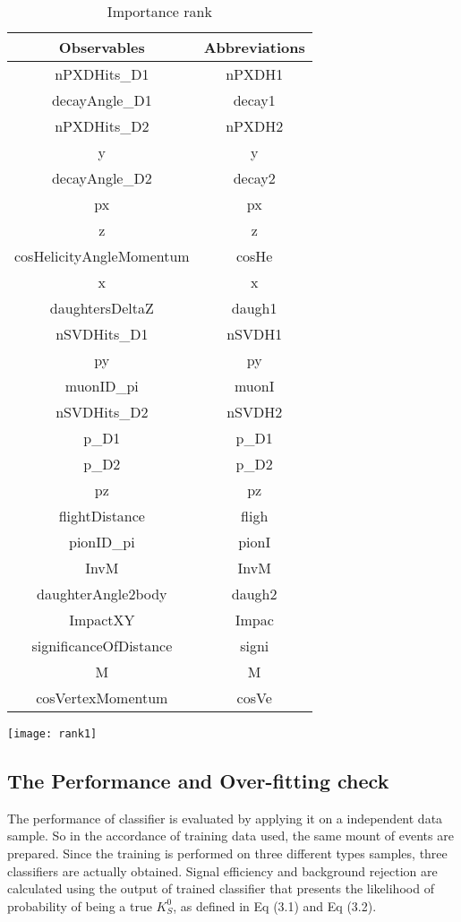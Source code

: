  \begin{table} [ht]
 	\begin{minipage}[t]{0.5\linewidth}
 		\centering
 		\caption{The Abbreviations.}
 		\begin{tabular}{c|c}
 			\hline
 			Observables &  Abbreviations\\
 			\hline
 			nPXDHits\_D1 &  nPXDH1 \\
 			decayAngle\_D1 & decay1 \\
 			nPXDHits\_D2 & nPXDH2\\
 			y & y \\
 			decayAngle\_D2 & decay2\\
 			px & px\\
 			z & z \\
 			cosHelicityAngleMomentum & cosHe\\
 			x & x \\
 			daughtersDeltaZ & daugh1\\
 			nSVDHits\_D1 & nSVDH1\\
 			py & py\\
 			muonID\_pi & muonI\\
 			nSVDHits\_D2 & nSVDH2\\
 			p\_D1 & p\_D1\\
 			p\_D2 & p\_D2\\
 			pz & pz \\
 			flightDistance & fligh\\
 			pionID\_pi & pionI\\
 			InvM & InvM \\
 			daughterAngle2body & daugh2\\
 			ImpactXY & Impac \\
 			significanceOfDistance & signi \\
 			M & M \\
 			cosVertexMomentum & cosVe \\
 			\hline
 		\end{tabular}
 		\label{fig:side:a} 
 	\end{minipage}
 	\begin{minipage}[t]{0.5\linewidth}
 		\centering 
 		\caption{Importance rank }
 		\texttt{[image: rank1]}
 		\label{fig:side:b} 
 	\end{minipage}
 \end{table}

\subsection{The Performance and Over-fitting check}
The performance of classifier is evaluated by applying it on a independent data sample. So in the accordance of training data used, the same mount of events are prepared. Since the training is performed on three different types samples, three classifiers are actually obtained. Signal efficiency and background rejection are calculated using the output of trained classifier that presents the likelihood of probability of being a true $K_S^0$, as defined in Eq (3.1) and Eq (3.2).  

